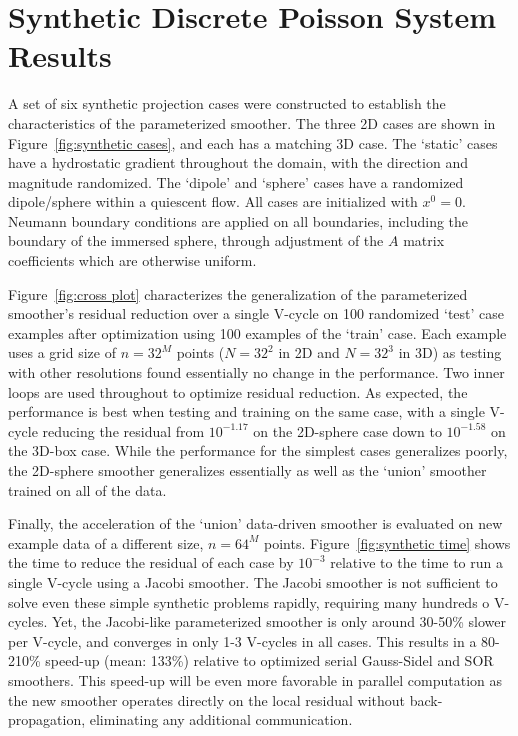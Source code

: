 \documentclass[review]{elsarticle}
\begin{document}
\section{Synthetic Discrete Poisson System Results}

A set of six synthetic projection cases were constructed to establish the characteristics of the parameterized smoother. The three 2D cases are shown in Figure~\ref{fig:synthetic cases}, and each has a matching 3D case. The `static' cases have a hydrostatic gradient throughout the domain, with the direction and magnitude randomized. The `dipole' and `sphere' cases have a randomized dipole/sphere within a quiescent flow. All cases are initialized with $x^0=0$.
Neumann boundary conditions are applied on all boundaries, including the boundary of the immersed sphere, through adjustment of the $A$ matrix coefficients which are otherwise uniform. 

Figure~\ref{fig:cross plot} characterizes the generalization of the parameterized smoother's residual reduction over a single V-cycle on 100 randomized `test' case examples after optimization using 100 examples of the `train' case. Each example uses a grid size of $n=32^M$ points ($N=32^2$ in 2D and $N=32^3$ in 3D) as testing with other resolutions found essentially no change in the performance. Two inner loops are used throughout to optimize residual reduction. As expected, the performance is best when testing and training on the same case, with a single V-cycle reducing the residual from $10^{-1.17}$ on the 2D-sphere case down to $10^{-1.58}$ on the 3D-box case. While the performance for the simplest cases generalizes poorly, the 2D-sphere smoother generalizes essentially as well as the `union' smoother trained on all of the data. 

Finally, the acceleration of the `union' data-driven smoother is evaluated on new example data of a different size, $n=64^M$ points. Figure~\ref{fig:synthetic time} shows the time to reduce the residual of each case by $10^{-3}$ relative to the time to run a single V-cycle using a Jacobi smoother. The Jacobi smoother is not sufficient to solve even these simple synthetic problems rapidly, requiring many hundreds o V-cycles. Yet, the Jacobi-like parameterized smoother is only around 30-50\% slower per V-cycle, and converges in only 1-3 V-cycles in all cases. This results in a 80-210\% speed-up (mean: 133\%) relative to optimized serial Gauss-Sidel and SOR smoothers. This speed-up will be even more favorable in parallel computation as the new smoother operates directly on the local residual without back-propagation, eliminating any additional communication.
\end{document}
